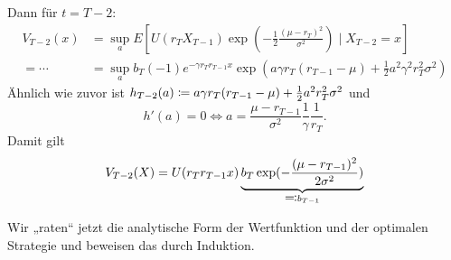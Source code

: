 \documentclass[a4paper,twoside,DIV15,BCOR12mm]{scrbook}
\begin{document}
\begin{beispiel}
Dann für $t=T-2$:
\begin{align*}
V_{T-2}(x) &= \sup_a E[ U(r_T X_{T-1}) \exp(-\frac12 \frac{(\mu- r_T)^2}{\sigma^2}) \mid X_{T-2} = x] \\
= \cdots &= \sup_a b_T (-1) e^{-\gamma r_T r_{T-1} x} \exp(a\gamma r_T (r_{T-1} - \mu) + \frac12 a^2\gamma^2 r_T^2 \sigma^2)
\end{align*}
Ähnlich wie zuvor ist $h_{T-2}(a) \da a \gamma r_T(r_{T-1} - \mu) + \frac12 a^2r_T^2\sigma^2$ und
\[
h'(a) = 0 \iff a = \frac{\mu-r_{T-1}}{\sigma^2} \frac1\gamma \frac1{r_T}. 
\]
Damit gilt
\begin{align*}
V_{T-2}(X) = U(r_T r_{T-1} x)\underbrace{b_T \exp(-\frac{(\mu - r_{T-1})^2}{2\sigma^2})}_{\ad b_{T-1}}
\end{align*}

Wir „raten“ jetzt die analytische Form der Wertfunktion und der optimalen Strategie und beweisen das durch Induktion.


\end{beispiel}
\end{document}
